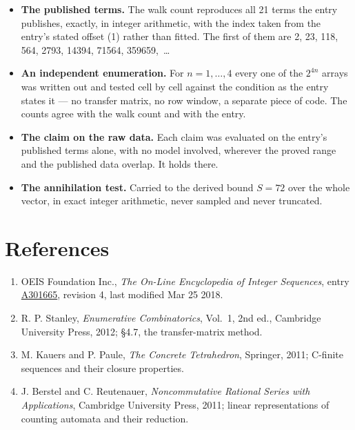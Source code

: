 \documentclass[11pt]{article}
\theoremstyle{definition}
\begin{document}
\begin{itemize}

\item {\bfseries The published terms.} The walk count reproduces all 21 terms the entry publishes, exactly, in integer arithmetic, with the index taken from the entry's stated offset (1) rather than fitted. The first of them are 2, 23, 118, 564, 2793, 14394, 71564, 359659,~\dots

\item {\bfseries An independent enumeration.} For $n = 1,\dots,4$ every one of the $2^{4n}$ arrays was written out and tested cell by cell against the condition as the entry states it --- no transfer matrix, no row window, a separate piece of code. The counts agree with the walk count and with the entry.

\item {\bfseries The claim on the raw data.} Each claim was evaluated on the entry's published terms alone, with no model involved, wherever the proved range and the published data overlap. It holds there.

\item {\bfseries The annihilation test.} Carried to the derived bound $S = 72$ over the whole vector, in exact integer arithmetic, never sampled and never truncated.

\end{itemize}

\section{References}

\begin{enumerate}

\item OEIS Foundation Inc., \emph{The On-Line Encyclopedia of Integer Sequences}, entry \href{https://oeis.org/A301665}{A301665}, revision 4, last modified Mar 25 2018.

\item R. P. Stanley, \emph{Enumerative Combinatorics}, Vol.~1, 2nd ed., Cambridge University Press, 2012; \S4.7, the transfer-matrix method.

\item M. Kauers and P. Paule, \emph{The Concrete Tetrahedron}, Springer, 2011; C-finite sequences and their closure properties.

\item J. Berstel and C. Reutenauer, \emph{Noncommutative Rational Series with Applications}, Cambridge University Press, 2011; linear representations of counting automata and their reduction.

\end{enumerate}
\end{document}
